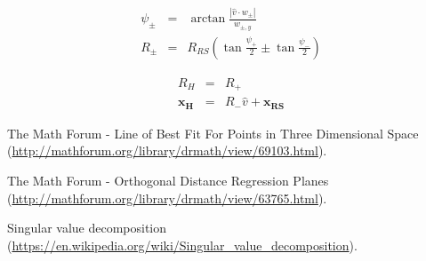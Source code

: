 \documentclass[chapter,a4paper,10pt]{oblivoir}
\begin{document}
\begin{eqnarray}
\psi_\pm &=& \arctan{\frac{\left|\hat{v}\cdot w_{\pm}\right|}{w_{\pm,y}}}\\
R_\pm &=& R_{RS} \left( \tan{\frac{\psi_+}{2}} \pm \tan{\frac{\psi_-}{2}} \right)
\end{eqnarray}

\begin{eqnarray}
R_H &=& R_+\\
\mathbf{x_H} &=& R_- \hat{v} + \mathbf{x_{RS}}
\end{eqnarray}



\begin{thebibliography}{}

The Math Forum - Line of Best Fit For Points in Three Dimensional Space
(\url{http://mathforum.org/library/drmath/view/69103.html}).

The Math Forum - Orthogonal Distance Regression Planes (\url{http://mathforum.org/library/drmath/view/63765.html}).

Singular value decomposition
(\url{https://en.wikipedia.org/wiki/Singular_value_decomposition}).

\end{thebibliography}
\end{document}
